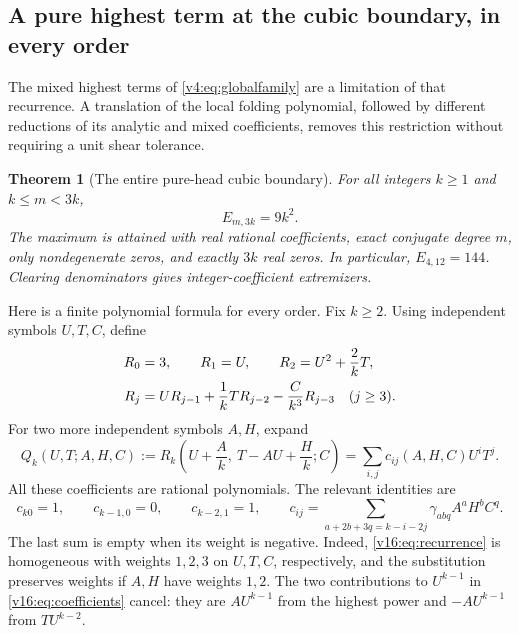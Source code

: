 \documentclass[UTF8,11pt]{ctexart}
\newtheorem{thm}{Theorem}[section]
\theoremstyle{definition}
\numberwithin{equation}{section}
\begin{document}
\subsection{A pure highest term at the cubic boundary, in every order}
\label{v16:sec:borderline}

The mixed highest terms of \eqref{v4:eq:globalfamily} are a limitation
of that recurrence. A translation of the local folding polynomial,
followed by different reductions of its analytic and mixed coefficients,
removes this restriction without requiring a unit shear tolerance.

\begin{thm}[The entire pure-head cubic boundary]
\label{v16:thm:borderline}
For all integers $k\ge1$ and $k\le m<3k$,
\begin{equation}\label{v16:eq:sharp}
 E_{m,3k}=9k^2.
\end{equation}
The maximum is attained with real rational coefficients, exact
conjugate degree $m$, only nondegenerate zeros, and exactly $3k$
real zeros. In particular, $E_{4,12}=144$. Clearing denominators
gives integer-coefficient extremizers.
\end{thm}

Here is a finite polynomial formula for every order. Fix $k\ge2$.
Using independent symbols $U,T,C$, define
\begin{align}
 R_0&=3,\qquad R_1=U,\qquad R_2=U^2+\frac2kT,\notag\\
 R_j&=UR_{j-1}+\frac1kTR_{j-2}-\frac{C}{k^3}R_{j-3}
       \quad(j\ge3).
                                      \label{v16:eq:recurrence}
\end{align}
For two more independent symbols $A,H$, expand
\begin{equation}\label{v16:eq:coefficients}
 Q_k(U,T;A,H,C)
 :=R_k\left(U+\frac Ak,\ T-AU+\frac Hk;C\right)
 =\sum_{i,j}c_{ij}(A,H,C)U^iT^j.
\end{equation}
All these coefficients are rational polynomials. The relevant identities
are
\begin{equation}\label{v16:eq:weights}
 c_{k0}=1,\qquad c_{k-1,0}=0,\qquad c_{k-2,1}=1,
 \qquad
 c_{ij}=\sum_{a+2b+3q=k-i-2j}\gamma_{abq}A^aH^bC^q.
\end{equation}
The last sum is empty when its weight is negative. Indeed,
\eqref{v16:eq:recurrence} is homogeneous with weights $1,2,3$
on $U,T,C$, respectively, and the substitution preserves weights
if $A,H$ have weights $1,2$. The two contributions to $U^{k-1}$
in \eqref{v16:eq:coefficients} cancel: they are $AU^{k-1}$ from
the highest power and $-AU^{k-1}$ from $TU^{k-2}$.
\end{document}
